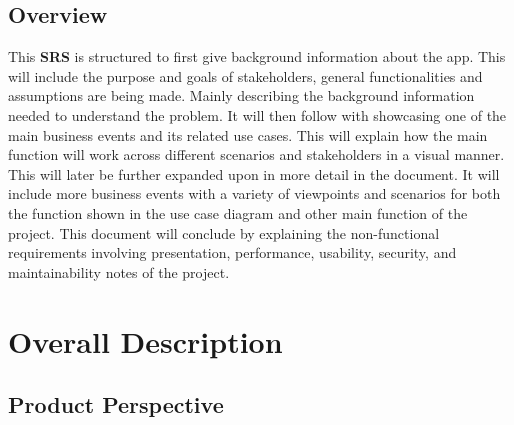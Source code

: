 \documentclass[]{article}
\begin{document}
\subsection{Overview}
\label{sub:overview}
This \textbf{SRS} is structured to first give background information about the app. This will include the purpose and goals of stakeholders, general functionalities and assumptions are being made. Mainly describing the background information needed to understand the problem. It will then follow with showcasing one of the main business events and its related use cases. This will explain how the main function will work across different scenarios and stakeholders in a visual manner. This will later be further expanded upon in more detail in the document. It will include more business events with a variety of viewpoints and scenarios for both the function shown in the use case diagram and other main function of the project. This document will conclude by explaining the non-functional requirements involving presentation, performance, usability, security, and maintainability notes of the project.  


\section{Overall Description}
\label{sec:overall_description}


\subsection{Product Perspective}
\label{sub:product_perspective}
\end{document}
